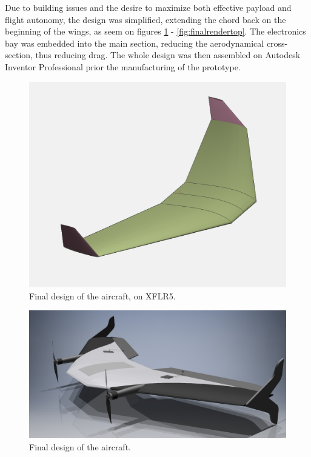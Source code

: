 Due to building issues and the desire to maximize both effective payload and flight autonomy, the design was simplified, extending the chord back on the beginning of the wings, as seem on figures \ref{fig:final} - \ref{fig:finalrendertop}.
The electronics bay was embedded into the main section, reducing the aerodynamical cross-section, thus reducing drag. The whole design was then assembled on Autodesk Inventor Professional prior the manufacturing of the prototype.
	

\begin{figure}
\centering
  \includegraphics[width=\linewidth]{figs/final.png}
  \caption{Final design of the aircraft, on XFLR5.}
  \label{fig:final}
\end{figure}
	
\begin{figure}
\centering
  \includegraphics[width=\linewidth]{figs/finalrender.png}
  \caption{Final design of the aircraft.}
  \label{fig:finalrender}
\end{figure}

